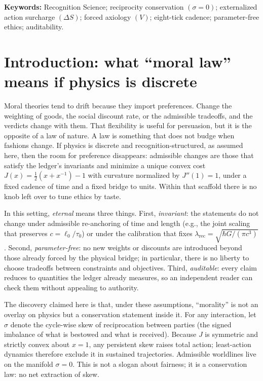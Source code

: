 \documentclass[11pt]{article}
\begin{document}
\noindent\textbf{Keywords:} Recognition Science; reciprocity conservation \((\sigma=0)\); externalized action surcharge \((\Delta S)\); forced axiology \((V)\); eight-tick cadence; parameter-free ethics; auditability.

\section{Introduction: what ``moral law'' means if physics is discrete}

Moral theories tend to drift because they import preferences. Change the weighting of goods, the social discount rate, or the admissible tradeoffs, and the verdicts change with them. That flexibility is useful for persuasion, but it is the opposite of a law of nature. A law is something that does not budge when fashions change. If physics is discrete and recognition-structured, as assumed here, then the room for preference disappears: admissible changes are those that satisfy the ledger’s invariants and minimize a unique convex cost \(J(x)=\tfrac12(x+x^{-1})-1\) with curvature normalized by \(J''(1)=1\), under a fixed cadence of time and a fixed bridge to units. Within that scaffold there is no knob left over to tune ethics by taste.

In this setting, \emph{eternal} means three things. First, \emph{invariant}: the statements do not change under admissible re-anchoring of time and length (e.g., the joint scaling that preserves \(c=\ell_0/\tau_0\)) or under the calibration that fixes \(\lambda_{\mathrm{rec}}=\sqrt{\hbar G/(\pi c^3)}\). Second, \emph{parameter-free}: no new weights or discounts are introduced beyond those already forced by the physical bridge; in particular, there is no liberty to choose tradeoffs between constraints and objectives. Third, \emph{auditable}: every claim reduces to quantities the ledger already measures, so an independent reader can check them without appealing to authority.

The discovery claimed here is that, under these assumptions, “morality” is not an overlay on physics but a conservation statement inside it. For any interaction, let \(\sigma\) denote the cycle-wise skew of reciprocation between parties (the signed imbalance of what is bestowed and what is received). Because \(J\) is symmetric and strictly convex about \(x=1\), any persistent skew raises total action; least-action dynamics therefore exclude it in sustained trajectories. Admissible worldlines live on the manifold \(\sigma=0\). This is not a slogan about fairness; it is a conservation law: no net extraction of skew.
\end{document}
